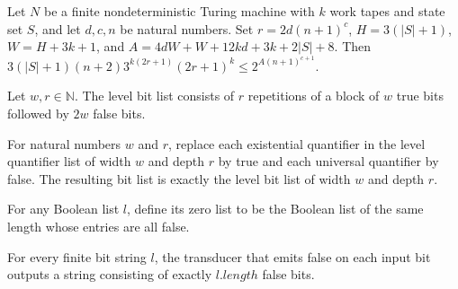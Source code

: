 \begin{theorem}
\label{Complexity.TQBFHard.configBound_le_two_pow}
\leanok
{}
Let $N$ be a finite nondeterministic Turing machine with $k$ work tapes and state set
$S$, and let $d,c,n$ be natural numbers. Set $r=2d(n+1)^c$, $H=3(|S|+1)$, $W=H+3k+1$,
and $A=4dW+W+12kd+3k+2|S|+8$. Then $3(|S|+1)(n+2)3^{k(2r+1)}(2r+1)^k \le
2^{A(n+1)^{c+1}}$.
\end{theorem}

\begin{definition}
\label{Complexity.TQBFHard.levelBits}
\leanok
Let $w,r\in\mathbb{N}$. The level bit list consists of $r$ repetitions of a block of $w$
true bits followed by $2w$ false bits.
\end{definition}

\begin{theorem}
\label{Complexity.TQBFHard.map_quantBit_levelQuants}
\leanok
{}
For natural numbers $w$ and $r$, replace each existential quantifier in the level
quantifier list of width $w$ and depth $r$ by true and each universal quantifier by
false. The resulting bit list is exactly the level bit list of width $w$ and depth $r$.
\end{theorem}

\begin{definition}
\label{Complexity.TQBFHard.zeroes}
\leanok
{}
For any Boolean list $l$, define its zero list to be the Boolean list of the same length
whose entries are all false.
\end{definition}

\begin{theorem}
\label{Complexity.TQBFHard.zeroes_eq}
\leanok
{}
For every finite bit string $l$, the transducer that emits false on each input bit
outputs a string consisting of exactly $l.length$ false bits.
\end{theorem}

